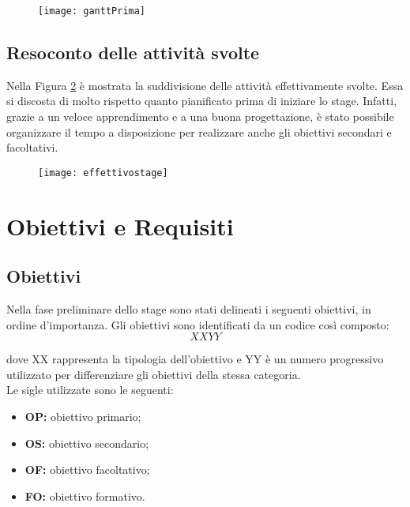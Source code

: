 \begin{figure}[!h]
\centering
    \texttt{[image: ganttPrima]} 
    \label{primastage}
    
\end{figure}

\subsection{Resoconto delle attività svolte}
Nella Figura \ref{dopostage} è mostrata la suddivisione delle attività effettivamente svolte. Essa si discosta di molto rispetto quanto pianificato prima di iniziare lo stage. Infatti, grazie a un veloce apprendimento e a una buona progettazione, è stato possibile organizzare il tempo a disposizione per realizzare anche gli obiettivi secondari e facoltativi.
\\

\begin{figure}[!h]
\centering
    \texttt{[image: effettivostage]} 
    \label{dopostage}
\end{figure}
\newpage

\section{Obiettivi e Requisiti}

\subsection{Obiettivi}
Nella fase preliminare dello stage sono stati delineati i seguenti obiettivi, in ordine d'importanza. Gli obiettivi sono identificati da un codice così composto:
$$ XXYY $$

dove XX rappresenta la tipologia dell'obiettivo e YY è un numero progressivo utilizzato per differenziare gli obiettivi della stessa categoria.
\\
Le sigle utilizzate sono le seguenti:

\begin{itemize}
\item \textbf{OP:} obiettivo primario;
\item \textbf{OS:} obiettivo secondario;
\item \textbf{OF:} obiettivo facoltativo;
\item \textbf{FO:} obiettivo formativo.
\end{itemize}

